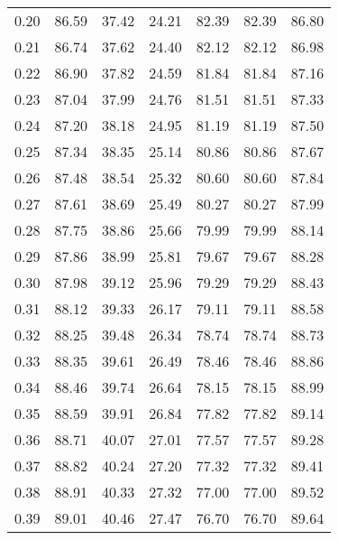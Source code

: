 \begin{tabular}{|c|c|c|c|c|c|c|}
      0.20 &     86.59 &     37.42 &      24.21 &   82.39 &      82.39 &         86.80 \\
      0.21 &     86.74 &     37.62 &      24.40 &   82.12 &      82.12 &         86.98 \\
      0.22 &     86.90 &     37.82 &      24.59 &   81.84 &      81.84 &         87.16 \\
      0.23 &     87.04 &     37.99 &      24.76 &   81.51 &      81.51 &         87.33 \\
      0.24 &     87.20 &     38.18 &      24.95 &   81.19 &      81.19 &         87.50 \\
      0.25 &     87.34 &     38.35 &      25.14 &   80.86 &      80.86 &         87.67 \\
      0.26 &     87.48 &     38.54 &      25.32 &   80.60 &      80.60 &         87.84 \\
      0.27 &     87.61 &     38.69 &      25.49 &   80.27 &      80.27 &         87.99 \\
      0.28 &     87.75 &     38.86 &      25.66 &   79.99 &      79.99 &         88.14 \\
      0.29 &     87.86 &     38.99 &      25.81 &   79.67 &      79.67 &         88.28 \\
      0.30 &     87.98 &     39.12 &      25.96 &   79.29 &      79.29 &         88.43 \\
      0.31 &     88.12 &     39.33 &      26.17 &   79.11 &      79.11 &         88.58 \\
      0.32 &     88.25 &     39.48 &      26.34 &   78.74 &      78.74 &         88.73 \\
      0.33 &     88.35 &     39.61 &      26.49 &   78.46 &      78.46 &         88.86 \\
      0.34 &     88.46 &     39.74 &      26.64 &   78.15 &      78.15 &         88.99 \\
      0.35 &     88.59 &     39.91 &      26.84 &   77.82 &      77.82 &         89.14 \\
      0.36 &     88.71 &     40.07 &      27.01 &   77.57 &      77.57 &         89.28 \\
      0.37 &     88.82 &     40.24 &      27.20 &   77.32 &      77.32 &         89.41 \\
      0.38 &     88.91 &     40.33 &      27.32 &   77.00 &      77.00 &         89.52 \\
      0.39 &     89.01 &     40.46 &      27.47 &   76.70 &      76.70 &         89.64 \\

\end{tabular}
